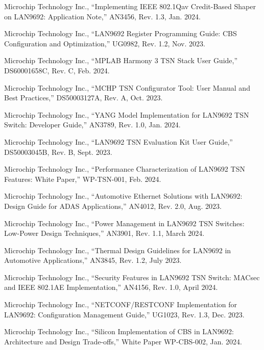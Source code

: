 \documentclass[10pt, journal, compsoc]{IEEEtran}
\begin{document}
\begin{thebibliography}{99}
Microchip Technology Inc., ``Implementing IEEE 802.1Qav Credit-Based Shaper on LAN9692: Application Note,'' AN3456, Rev. 1.3, Jan. 2024.

Microchip Technology Inc., ``LAN9692 Register Programming Guide: CBS Configuration and Optimization,'' UG0982, Rev. 1.2, Nov. 2023.

Microchip Technology Inc., ``MPLAB Harmony 3 TSN Stack User Guide,'' DS60001658C, Rev. C, Feb. 2024.

Microchip Technology Inc., ``MCHP TSN Configurator Tool: User Manual and Best Practices,'' DS50003127A, Rev. A, Oct. 2023.

Microchip Technology Inc., ``YANG Model Implementation for LAN9692 TSN Switch: Developer Guide,'' AN3789, Rev. 1.0, Jan. 2024.

Microchip Technology Inc., ``LAN9692 TSN Evaluation Kit User Guide,'' DS50003045B, Rev. B, Sept. 2023.

Microchip Technology Inc., ``Performance Characterization of LAN9692 TSN Features: White Paper,'' WP-TSN-001, Feb. 2024.

Microchip Technology Inc., ``Automotive Ethernet Solutions with LAN9692: Design Guide for ADAS Applications,'' AN4012, Rev. 2.0, Aug. 2023.

Microchip Technology Inc., ``Power Management in LAN9692 TSN Switches: Low-Power Design Techniques,'' AN3901, Rev. 1.1, March 2024.

Microchip Technology Inc., ``Thermal Design Guidelines for LAN9692 in Automotive Applications,'' AN3845, Rev. 1.2, July 2023.

Microchip Technology Inc., ``Security Features in LAN9692 TSN Switch: MACsec and IEEE 802.1AE Implementation,'' AN4156, Rev. 1.0, April 2024.

Microchip Technology Inc., ``NETCONF/RESTCONF Implementation for LAN9692: Configuration Management Guide,'' UG1023, Rev. 1.3, Dec. 2023.

Microchip Technology Inc., ``Silicon Implementation of CBS in LAN9692: Architecture and Design Trade-offs,'' White Paper WP-CBS-002, Jan. 2024.


\end{thebibliography}
\end{document}
